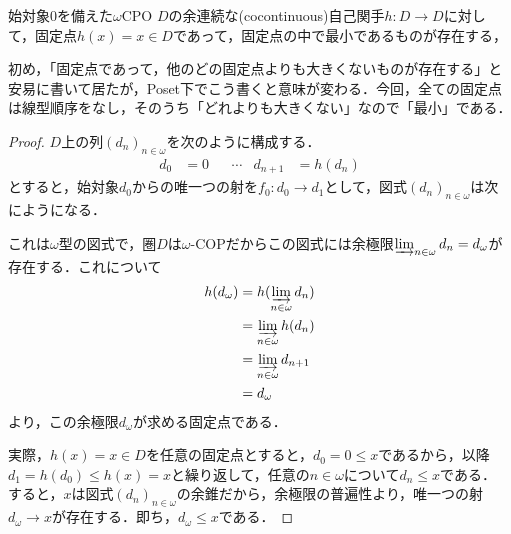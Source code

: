 \documentclass[uplatex, dvipdfmx]{jsarticle}
\begin{document}
\begin{proposition}
    始対象$0$を備えた$\omega$CPO $D$の余連続な(cocontinuous)自己関手$h:D\to D$に対して，固定点$h(x)=x\in D$であって，固定点の中で最小であるものが存在する，
\end{proposition}
\begin{remark*}
    初め，「固定点であって，他のどの固定点よりも大きくないものが存在する」と安易に書いて居たが，Poset下でこう書くと意味が変わる．今回，全ての固定点は線型順序をなし，そのうち「どれよりも大きくない」なので「最小」である．
\end{remark*}
\begin{proof}
    $D$上の列$(d_n)_{n\in\omega}$を次のように構成する．
    \begin{align*}
        d_0 &= 0 & &\cdots& d_{n+1}&= h(d_n)
    \end{align*}
    とすると，始対象$d_0$からの唯一つの射を$f_0:d_0\to d_1$として，図式$(d_n)_{n\in\omega}$は次にようになる．
    \begin{center}
    \end{center}
    これは$\omega$型の図式で，圏$D$は$\omega$-COPだからこの図式には余極限$\varinjlim_{n\in\omega}d_n=d_\omega$が存在する．これについて
    \begin{align*}
        h(d_\omega) &= h(\varinjlim_{n\in\omega}d_n) \\
        &= \varinjlim_{n\in\omega}h(d_n) \\
        &= \varinjlim_{n\in\omega}d_{n+1} \\
        &=d_\omega
    \end{align*}
    より，この余極限$d_\omega$が求める固定点である．

    実際，$h(x)=x\in D$を任意の固定点とすると，$d_0=0\le x$であるから，以降$d_1=h(d_0)\le h(x)=x$と繰り返して，任意の$n\in\omega$について$d_n\le x$である．
    すると，$x$は図式$(d_n)_{n\in\omega}$の余錐だから，余極限の普遍性より，唯一つの射$d_\omega\to x$が存在する．即ち，$d_\omega\le x$である．
\end{proof}
\end{document}

